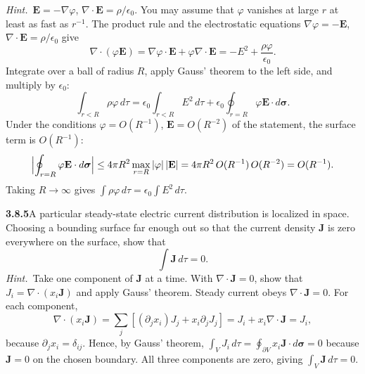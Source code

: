 \emph{Hint.}~$\mathbf{E}=-\nabla\varphi$,
$\nabla\cdot\mathbf{E}=\rho/\epsilon_{0}$. You may assume that $\varphi$
vanishes at large $r$ at least as fast as $r^{-1}$.
\solution
The product rule and the electrostatic equations
$\nabla\varphi=-\mathbf E$, $\nabla\cdot\mathbf E=\rho/\epsilon_0$ give
\[
\nabla\cdot(\varphi\mathbf E)
=\nabla\varphi\cdot\mathbf E+\varphi\nabla\cdot\mathbf E
=-E^2+\frac{\rho\varphi}{\epsilon_0}.
\]
Integrate over a ball of radius $R$, apply Gauss' theorem to the left
side, and multiply by $\epsilon_0$:
\[
\int_{r<R}\rho\varphi\,d\tau
=\epsilon_0\int_{r<R}E^2\,d\tau
+\epsilon_0\oint_{r=R}\varphi\mathbf E\cdot d\boldsymbol\sigma.
\]
Under the conditions $\varphi=O(R^{-1})$, $\mathbf E=O(R^{-2})$ of the
statement, the surface term is $O(R^{-1})$:
\[
\Bigl|\oint_{r=R}\varphi\mathbf E\cdot d\boldsymbol\sigma\Bigr|
\le4\pi R^2\max_{r=R}|\varphi|\,|\mathbf E|
=4\pi R^2\,O(R^{-1})\,O(R^{-2})=O(R^{-1}).
\]
Taking $R\to\infty$ gives
$\boxed{\int\rho\varphi\,d\tau=\epsilon_0\int E^2\,d\tau}$.

\par\bigskip
\noindent\textbf{3.8.5}\quad A particular steady-state electric current
distribution is localized in space. Choosing a bounding surface far enough out
so that the current density $\mathbf{J}$ is zero everywhere on the surface,
show that
\[
\int\mathbf{J}\,d\tau=0.
\]
\emph{Hint.}~Take one component of $\mathbf{J}$ at a time. With
$\nabla\cdot\mathbf{J}=0$, show that $J_{i}=\nabla\cdot(x_{i}\mathbf{J})$ and
apply Gauss' theorem.
\solution
Steady current obeys $\nabla\cdot\mathbf J=0$.
For each component,
\[
\nabla\cdot(x_i\mathbf J)=
\sum_j[(\partial_jx_i)J_j+x_i\partial_jJ_j]
=J_i+x_i\nabla\cdot\mathbf J=J_i,
\]
because $\partial_jx_i=\delta_{ij}$. Hence, by Gauss' theorem,
$\int_VJ_i\,d\tau=\oint_{\partial V}x_i\mathbf J\cdot d\boldsymbol\sigma=0$
because $\mathbf J=0$ on the chosen boundary. All three components
are zero, giving $\boxed{\int_V\mathbf J\,d\tau=0}$.

